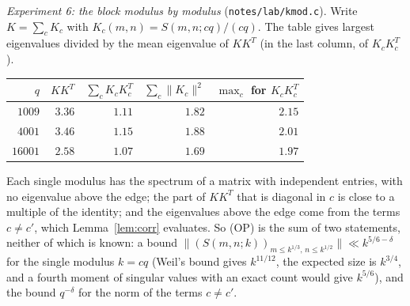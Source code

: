 \documentclass[11pt]{amsart}
\theoremstyle{definition}
\theoremstyle{remark}
\numberwithin{equation}{section}
\begin{document}
\emph{Experiment 6: the block modulus by modulus}
(\texttt{notes/lab/kmod.c}).  Write $K=\sum_cK_c$ with
$K_c(m,n)=S(m,n;cq)/(cq)$.  The table gives largest eigenvalues divided by
the mean eigenvalue of $KK^{T}$ (in the last column, of $K_cK_c^{T}$).

\medskip
\begin{center}
\begin{tabular}{rrrrr}
$q$ & $KK^{T}$ & $\sum_cK_cK_c^{T}$ & $\sum_c\|K_c\|^2$ &
$\max_c$ for $K_cK_c^{T}$\\ \hline
$1009$ & $3.36$ & $1.11$ & $1.82$ & $2.15$\\
$4001$ & $3.46$ & $1.15$ & $1.88$ & $2.01$\\
$16001$ & $2.58$ & $1.07$ & $1.69$ & $1.97$
\end{tabular}
\end{center}
\medskip

Each single modulus has the spectrum of a matrix with independent entries,
with no eigenvalue above the edge; the part of $KK^{T}$ that is diagonal in
$c$ is close to a multiple of the identity; and the eigenvalues above the
edge come from the terms $c\ne c'$, which Lemma~\ref{lem:corr} evaluates.
So (OP) is the sum of two statements, neither of which is known: a bound
$\|(S(m,n;k))_{m\le k^{1/3},\,n\le k^{1/2}}\|\ll k^{5/6-\delta}$ for the
single modulus $k=cq$ (Weil's bound gives $k^{11/12}$, the expected size is
$k^{3/4}$, and a fourth moment of singular values with an exact count would
give $k^{5/6}$), and the bound $q^{-\delta}$ for the norm of the terms
$c\ne c'$.
\end{document}
